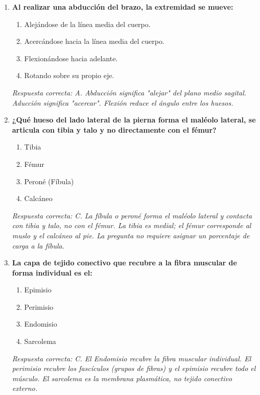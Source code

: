\begin{enumerate}[label=\textbf{\arabic*.}]
    \item \textbf{Al realizar una abducción del brazo, la extremidad se mueve:}
    \begin{enumerate}
        \item[A)] Alejándose de la línea media del cuerpo.
        \item[B)] Acercándose hacia la línea media del cuerpo.
        \item[C)] Flexionándose hacia adelante.
        \item[D)] Rotando sobre su propio eje.
    \end{enumerate}
    \textit{Respuesta correcta: A. Abducción significa "alejar" del plano medio sagital. Aducción significa "acercar". Flexión reduce el ángulo entre los huesos.}

    \item \textbf{¿Qué hueso del lado lateral de la pierna forma el maléolo lateral, se articula con tibia y talo y no directamente con el fémur?}
    \begin{enumerate}
        \item[A)] Tibia
        \item[B)] Fémur
        \item[C)] Peroné (Fíbula)
        \item[D)] Calcáneo
    \end{enumerate}
    \textit{Respuesta correcta: C. La fíbula o peroné forma el maléolo lateral y contacta con tibia y talo, no con el fémur. La tibia es medial; el fémur corresponde al muslo y el calcáneo al pie. La pregunta no requiere asignar un porcentaje de carga a la fíbula.}

    \item \textbf{La capa de tejido conectivo que recubre a la fibra muscular de forma individual es el:}
    \begin{enumerate}
        \item[A)] Epimisio
        \item[B)] Perimisio
        \item[C)] Endomisio
        \item[D)] Sarcolema
    \end{enumerate}
    \textit{Respuesta correcta: C. El Endomisio recubre la fibra muscular individual. El perimisio recubre los fascículos (grupos de fibras) y el epimisio recubre todo el músculo. El sarcolema es la membrana plasmática, no tejido conectivo externo.}

\end{enumerate}


